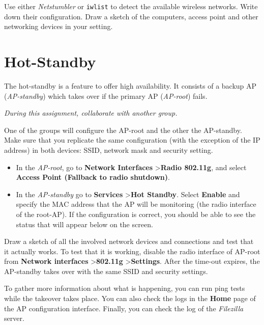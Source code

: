 Use either \emph{Netstumbler} or \texttt{\color{blue}iwlist} to detect the available wireless networks. Write down their configuration. Draw a sketch of the computers, access point and other networking devices in your setting.

\section{Hot-Standby}

The hot-standby is a feature to offer high availability. It consists of a backup AP (\emph{AP-standby}) which takes over if the primary AP (\emph{AP-root}) fails.

\emph{During this assignment, collaborate with another group.}

One of the groups will configure the AP-root and the other the AP-standby.
Make sure that you replicate the same configuration (with the exception of the IP address) in both devices: SSID, network mask and security setting.

\begin{itemize}
\item In the \emph{AP-root}, go to \textbf{\sf Network Interfaces} \textgreater \textbf{\sf Radio 802.11g}, and select \textbf{\sf Access Point (Fallback to radio shutdown)}.
\item In the \emph{AP-standby} go to \textbf{\sf Services} \textgreater \textbf{\sf Hot Standby}. Select \textbf{\sf Enable} and specify the MAC address that the AP will be monitoring (the radio interface of the root-AP). If the configuration is correct, you should be able to see the status that will appear below on the screen.
\end{itemize}

Draw a sketch of all the involved network devices and connections and test that it actually works. To test that it is working, disable the radio interface of AP-root from \textbf{\sf Network interfaces} \textgreater \textbf{\sf 802.11g} \textgreater \textbf{\sf Settings}. After the time-out expires, the AP-standby takes over with the same SSID and security settings.

To gather more information about what is happening, you can run ping tests while the takeover takes place. You can also check the logs in the \textbf{\sf Home} page of the AP configuration interface. Finally, you can check the log of the \emph{Filezilla} server.

